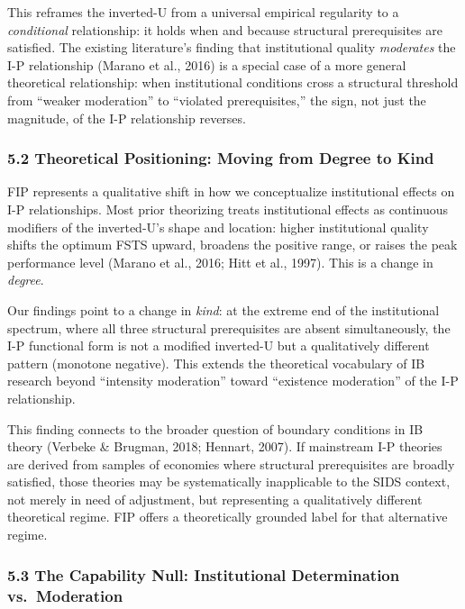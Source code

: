 \documentclass[
  12pt,a4paper]{article}
\begin{document}
This reframes the inverted-U from a universal empirical regularity to a
\emph{conditional} relationship: it holds when and because structural
prerequisites are satisfied. The existing literature's finding that
institutional quality \emph{moderates} the I-P relationship (Marano et
al., 2016) is a special case of a more general theoretical relationship:
when institutional conditions cross a structural threshold from ``weaker
moderation'' to ``violated prerequisites,'' the sign, not just the
magnitude, of the I-P relationship reverses.

\hypertarget{theoretical-positioning-moving-from-degree-to-kind}{%
\subsubsection{5.2 Theoretical Positioning: Moving from Degree to
Kind}\label{theoretical-positioning-moving-from-degree-to-kind}}

FIP represents a qualitative shift in how we conceptualize institutional
effects on I-P relationships. Most prior theorizing treats institutional
effects as continuous modifiers of the inverted-U's shape and location:
higher institutional quality shifts the optimum FSTS upward, broadens
the positive range, or raises the peak performance level (Marano et al.,
2016; Hitt et al., 1997). This is a change in \emph{degree}.

Our findings point to a change in \emph{kind}: at the extreme end of the
institutional spectrum, where all three structural prerequisites are
absent simultaneously, the I-P functional form is not a modified
inverted-U but a qualitatively different pattern (monotone negative).
This extends the theoretical vocabulary of IB research beyond
``intensity moderation'' toward ``existence moderation'' of the I-P
relationship.

This finding connects to the broader question of boundary conditions in
IB theory (Verbeke \& Brugman, 2018; Hennart, 2007). If mainstream I-P
theories are derived from samples of economies where structural
prerequisites are broadly satisfied, those theories may be
systematically inapplicable to the SIDS context, not merely in need of
adjustment, but representing a qualitatively different theoretical
regime. FIP offers a theoretically grounded label for that alternative
regime.

\hypertarget{the-capability-null-institutional-determination-vs.-moderation}{%
\subsubsection{5.3 The Capability Null: Institutional Determination
vs.~Moderation}\label{the-capability-null-institutional-determination-vs.-moderation}}
\end{document}
